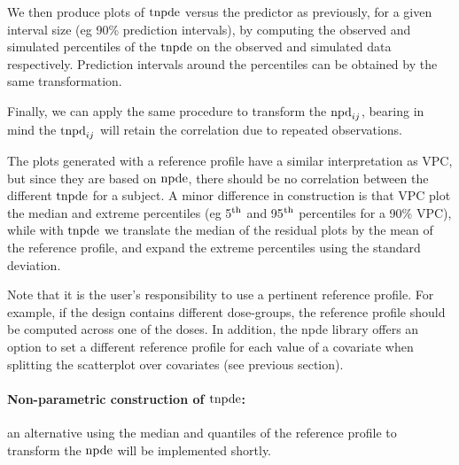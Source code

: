 We then produce plots of ${\rm tnpde}$ versus the predictor as previously, for a given interval size (eg 90\% prediction intervals), by computing the observed and simulated percentiles of the ${\rm tnpde}$ on the observed and simulated data respectively. Prediction intervals around the percentiles can be obtained by the same transformation.

Finally, we can apply the same procedure to transform the ${\rm npd}_{ij}$, bearing in mind the ${\rm tnpd}_{ij}$ will retain the correlation due to repeated observations.

The plots generated with a reference profile have a similar interpretation as VPC, but since they are based on ${\rm npde}$, there should be no correlation between the different ${\rm tnpde}$ for a subject.
A minor difference in construction is that VPC plot the median and extreme percentiles (eg 5$^{\rm th}$ and 95$^{\rm th}$ percentiles for a 90\% VPC), while with ${\rm tnpde}$ we translate the median of the residual plots by the mean of the reference profile, and expand the extreme percentiles using the standard deviation. 

Note that it is the user's responsibility to use a pertinent reference profile. For example, if the design contains different dose-groups, the reference profile should be computed across one of the doses. In addition, the {\sf npde} library offers an option to set a different reference profile for each value of a covariate when splitting the scatterplot over covariates (see previous section).


\paragraph{Non-parametric construction of ${\rm tnpde}$:} an alternative using the median and quantiles of the reference profile to transform the ${\rm npde}$ will be implemented shortly.

